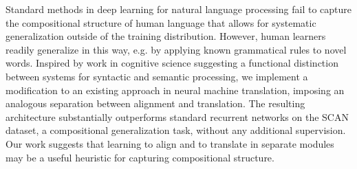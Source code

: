 Standard methods in deep learning for natural language processing fail to capture the compositional structure of human language that allows for systematic generalization outside of the training distribution. However, human learners readily generalize in this way, e.g. by applying known grammatical rules to novel words. Inspired by work in cognitive science suggesting a functional distinction between systems for syntactic and semantic processing, we implement a modification to an existing approach in neural machine translation, imposing an analogous separation between alignment and translation. The resulting architecture substantially outperforms standard recurrent networks on the SCAN dataset, a compositional generalization task, without any additional supervision. Our work suggests that learning to align and to translate in separate modules may be a useful heuristic for capturing compositional structure.
